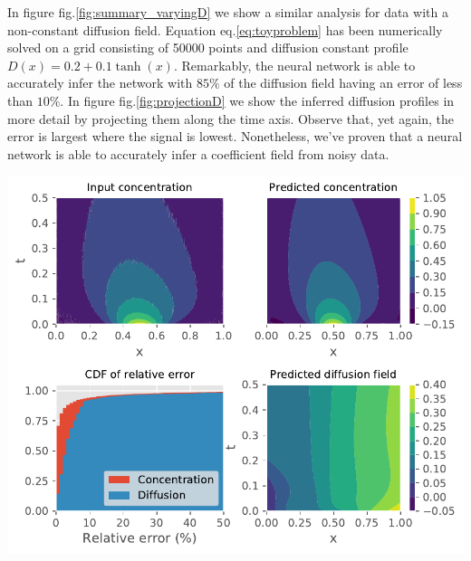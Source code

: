 \documentclass{Dissertate}
\let\origfigure\figure
\let\endorigfigure\endfigure
\renewenvironment{figure}[1][2] {
    \expandafter\origfigure\expandafter[H]
} {
    \endorigfigure
}
\begin{document}
In figure fig.\ref{fig:summary_varyingD} we show a similar analysis for
data with a non-constant diffusion field. Equation
eq.\ref{eq:toyproblem} has been numerically solved on a grid consisting
of 50000 points and diffusion constant profile
\(D(x) = 0.2 + 0.1\tanh(x)\). Remarkably, the neural network is able to
accurately infer the network with \(85\%\) of the diffusion field having
an error of less than \(10\%\). In figure fig.\ref{fig:projectionD} we
show the inferred diffusion profiles in more detail by projecting them
along the time axis. Observe that, yet again, the error is largest where
the signal is lowest. Nonetheless, we've proven that a neural network is
able to accurately infer a coefficient field from noisy data.

\begin{figure}
\hypertarget{fig:summary_varyingD}{%
\centering
\includegraphics{source/figures/pdf/summary_varyingD_varyingPINN.pdf}
\caption{We show the training data and predicted concentration profile
in the upper left and right panels. The lower right panel shows the
inferred diffusion field while the lower left panel shows the CDF of the
relative error of the diffusion and
concentration.}\label{fig:summary_varyingD}
}
\end{figure}
\end{document}
